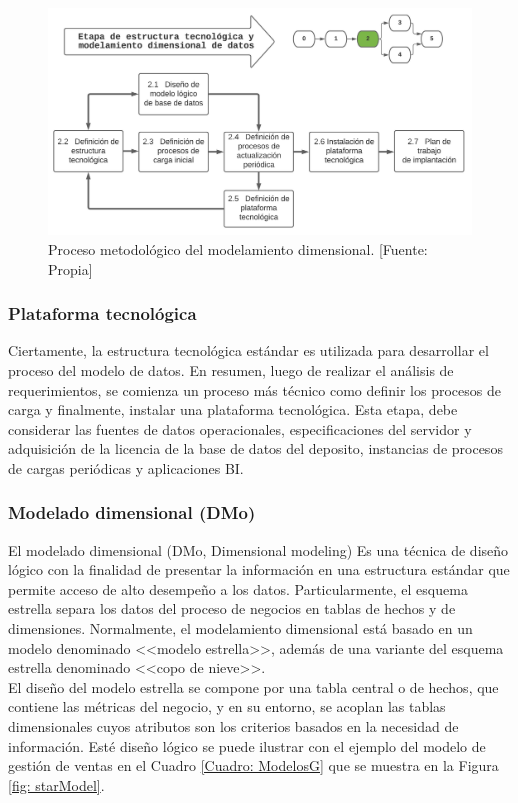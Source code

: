 \documentclass[11pt,titlepage]{report}
\begin{document}
\begin{figure}[h]
	\centering
	\includegraphics[width=1\linewidth]{Figuras/etapa2}
	\caption{Proceso metodológico del modelamiento dimensional. [Fuente: Propia]}
	\label{fig: etapa2}
\end{figure}

\subsubsection{Plataforma tecnológica}
Ciertamente, la estructura tecnológica estándar es utilizada para desarrollar el proceso del modelo de datos. En resumen, luego de realizar el análisis de requerimientos, se comienza un proceso más técnico como definir los procesos de carga y finalmente, instalar una plataforma tecnológica. Esta etapa, debe considerar las fuentes de datos operacionales, especificaciones del servidor y adquisición de la licencia de la base de datos del deposito, instancias de procesos de cargas periódicas y aplicaciones BI.


\subsubsection{Modelado dimensional (DMo)}
El modelado dimensional (DMo, Dimensional modeling) Es una técnica de diseño lógico con la finalidad de presentar la información en una estructura estándar que permite acceso de alto desempeño a los datos. Particularmente, el esquema estrella separa los datos del proceso de negocios en tablas de hechos y de dimensiones. Normalmente, el modelamiento dimensional está basado en un modelo denominado <<modelo estrella>>, además de una variante del esquema estrella denominado <<copo de nieve>>.\\

El diseño del modelo estrella se compone por una tabla central o de hechos, que contiene las métricas del negocio, y en su entorno, se acoplan las tablas dimensionales cuyos atributos son los criterios basados en la necesidad de información. Esté diseño lógico se puede ilustrar con el ejemplo del modelo de gestión de ventas en el Cuadro \ref{Cuadro: ModelosG} que se muestra en la Figura \ref{fig: starModel}.
\end{document}
